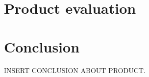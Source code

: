 

\section{Product evaluation}
\label{sec:project_evaluation-product_evaluation}



\section{Conclusion}
\label{sec:project_evaluation-conclusion}


INSERT CONCLUSION ABOUT PRODUCT.

\clearpage